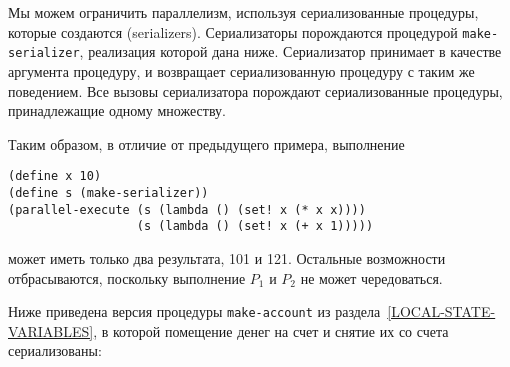 Мы можем ограничить параллелизм, используя
сериализованные процедуры, которые создаются
 (serializers). Сериализаторы
порождаются процедурой {\tt make-serializer}, реализация которой
дана ниже.  Сериализатор принимает в качестве аргумента процедуру, и
возвращает сериализованную процедуру с таким же поведением.  Все
вызовы сериализатора порождают сериализованные процедуры,
принадлежащие одному множеству.

Таким образом, в отличие от предыдущего примера,
выполнение

\begin{Verbatim}[fontsize=\small]
(define x 10)
(define s (make-serializer))
(parallel-execute (s (lambda () (set! x (* x x))))
                  (s (lambda () (set! x (+ x 1)))))
\end{Verbatim}
может иметь только два результата, 101 и 121.  Остальные возможности
отбрасываются, поскольку выполнение $P_1$ и $P_2$
не может чередоваться.

Ниже приведена версия  
процедуры {\tt make-account} из
раздела~\ref{LOCAL-STATE-VARIABLES}, в которой помещение денег на
счет и снятие их со счета сериализованы:


